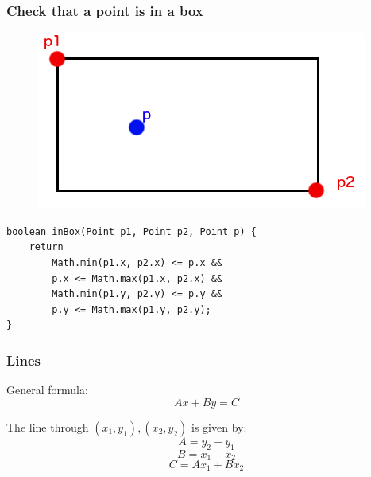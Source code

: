 \documentclass[pdf]{beamer}
\begin{document}
\begin{frame}[fragile]
	\frametitle{Check that a point is in a box}
	\begin{figure}
		\centering
		\includegraphics[width=0.7\linewidth]{box}
	\end{figure}
	\begin{lstlisting}
boolean inBox(Point p1, Point p2, Point p) {
    return 
        Math.min(p1.x, p2.x) <= p.x && 
        p.x <= Math.max(p1.x, p2.x) &&			           
        Math.min(p1.y, p2.y) <= p.y && 
        p.y <= Math.max(p1.y, p2.y);
}
	\end{lstlisting}
\end{frame}

\begin{frame}
	\frametitle{Lines}
	General formula:
	$$Ax+By=C$$
	
	The line through $(x_1,y_1),(x_2,y_2)$ is given by:
	$$A=y_2-y_1$$
	$$B=x_1-x_2$$
	$$C=Ax_1+Bx_2$$
\end{frame}
\end{document}
